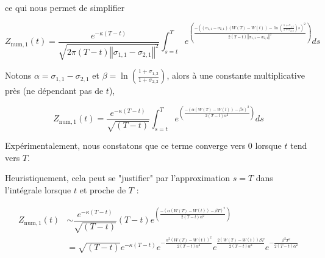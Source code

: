 \documentclass[../finalreport.tex]{subfiles}
\begin{document}
\par ce qui nous permet de simplifier 

\begin{displaymath}
Z_{\text{num}, 1} \left( t \right) =  \dfrac{e^{- {\kappa} \left( T - t\right)}}{\sqrt{2 \pi {(T - t) \left\Vert \sigma_{1, 1} - \sigma_{2, 1} \right\Vert^2}}} {\displaystyle \int_{s = t}^{T}} e^{\left( \frac{- \left( \left( \sigma_{1, 1} - \sigma_{2, 1} \right) \left( W\left(T\right) -  W\left(t\right) \right) - \ln \left( \frac{1 + {\sigma}_{1, 2}}{1 + {\sigma}_{2, 2}} \right) s  \right)^2}{2 {(T - t) \left\Vert \sigma_{1, 1} - \sigma_{2, 1} \right\Vert^2}} \right)} ds
\end{displaymath}

\par Notons $\alpha = \sigma_{1, 1} - \sigma_{2, 1}$ et $\beta = \ln \left( \frac{1 + {\sigma}_{1, 2}}{1 + {\sigma}_{2, 2}} \right)$, alors à une constante multiplicative près (ne dépendant pas de $t$),

\begin{displaymath}
Z_{\text{num}, 1} \left( t \right) =  \dfrac{e^{- {\kappa} \left( T - t\right)}}{\sqrt{(T - t)}} {\displaystyle \int_{s = t}^{T}} e^{\left( \frac{- \left( \alpha \left( W\left(T\right) -  W\left(t\right) \right) - \beta s  \right)^2}{2 {(T - t) \alpha^2}} \right)} ds
\end{displaymath}

\par Expérimentalement, nous constatons que ce terme converge vers 0 lorsque $t$ tend vers $T$. 
\par Heuristiquement, cela peut se "justifier" par l'approximation $s = T$ dans l'intégrale lorsque $t$ et proche de $T$ : 

\begin{displaymath}
	\begin{split}
	Z_{\text{num}, 1} \left( t \right) &\sim  \dfrac{e^{- {\kappa} \left( T - t\right)}}{\sqrt{(T - t)}} (T - t) e^{\left( \frac{- \left( \alpha \left( W\left(T\right) -  W\left(t\right) \right) - \beta T  \right)^2}{2 {(T - t) \alpha^2}} \right)} \\
	&= \sqrt{(T - t)} e^{- {\kappa} \left( T - t\right)}  e^{ - \frac{\alpha^2 \left( W\left(T\right) -  W\left(t\right) \right)^2}{2 (T - t) \alpha^2}} e^{ \frac{2 \left( W\left(T\right) -  W\left(t\right) \right) \beta T}{2 (T - t) \alpha^2}} e^{ - \frac{\beta^2 T^2}{2 (T - t) \alpha^2}}
	\end{split}
\end{displaymath}
\end{document}
